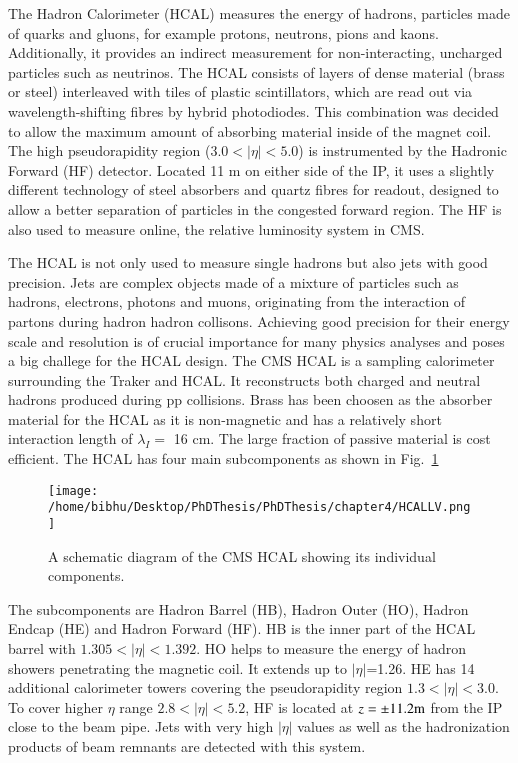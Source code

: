The Hadron Calorimeter (HCAL) measures the energy of hadrons, particles made of quarks and gluons, for example protons, neutrons, pions and kaons. Additionally, it provides an indirect measurement for non-interacting, uncharged particles such as neutrinos. The HCAL consists of layers of dense material (brass or steel) interleaved with tiles of plastic scintillators, which are read out via wavelength-shifting fibres by hybrid photodiodes. This combination was decided to allow the maximum amount of absorbing material inside of the magnet coil. The high pseudorapidity region ($3.0 < |\eta| < 5.0$)   is instrumented by the Hadronic Forward (HF) detector. Located 11 m on either side of the IP, it uses a slightly different technology of steel absorbers and quartz fibres for readout, designed to allow a better separation of particles in the congested forward region. The HF is also used to measure online, the relative luminosity system in CMS.

The HCAL is not only used to measure single hadrons but also jets with good precision. Jets are complex objects made of a mixture of particles such as hadrons, electrons, photons and muons, originating from the interaction of partons during hadron hadron collisons. Achieving good precision for their energy scale and resolution is of crucial importance for many physics analyses and poses a big challege for the HCAL  design. The CMS HCAL is a sampling calorimeter surrounding the Traker and HCAL. It reconstructs both charged and neutral hadrons produced during pp collisions. Brass has been choosen as the absorber material for the HCAL as it is non-magnetic and has a relatively short interaction length of $\lambda_{I} = $ 16 cm. The large fraction of passive material is cost efficient. The HCAL has four main subcomponents as shown in Fig.~\ref{fig:HCALLV}

\begin{figure}[h]
    \centering  
    \texttt{[image: /home/bibhu/Desktop/PhDThesis/PhDThesis/chapter4/HCALLV.png]}
    \caption{ \small A schematic diagram of the CMS HCAL showing its individual components.}
    \label{fig:HCALLV}
\end{figure}

The subcomponents are Hadron Barrel (HB), Hadron Outer (HO), Hadron Endcap (HE) and Hadron Forward (HF). HB is the inner part of the HCAL barrel with $1.305 < |\eta|<1.392$. HO helps to measure the energy of hadron showers penetrating the magnetic coil. It extends up to $|\eta| $=1.26. HE has 14 additional calorimeter towers covering the pseudorapidity region $1.3 <|\eta|<3.0$. To cover higher $\eta$ range $2.8<|\eta|<5.2$, HF is located at $ z= \pm 11.2 \rm m$ from the IP close to the beam pipe. Jets with very high $|\eta|$ values as well as the hadronization products of beam remnants are detected with this system.


